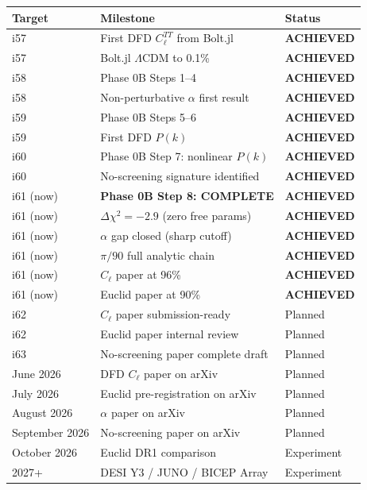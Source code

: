 \documentclass[11pt,a4paper]{article}
\begin{document}
\begin{center}
\begin{longtable}{lll}
\toprule
\textbf{Target} & \textbf{Milestone} & \textbf{Status} \\
\midrule
i57 & First DFD $C_\ell^{TT}$ from Bolt.jl & \textbf{ACHIEVED} \\
i57 & Bolt.jl $\Lambda$CDM to 0.1\% & \textbf{ACHIEVED} \\
i58 & Phase 0B Steps 1--4 & \textbf{ACHIEVED} \\
i58 & Non-perturbative $\alpha$ first result & \textbf{ACHIEVED} \\
i59 & Phase 0B Steps 5--6 & \textbf{ACHIEVED} \\
i59 & First DFD $P(k)$ & \textbf{ACHIEVED} \\
i60 & Phase 0B Step 7: nonlinear $P(k)$ & \textbf{ACHIEVED} \\
i60 & No-screening signature identified & \textbf{ACHIEVED} \\
i61 (now) & \textbf{Phase 0B Step 8: COMPLETE} & \textbf{ACHIEVED} \\
i61 (now) & $\Delta\chi^2 = -2.9$ (zero free params) & \textbf{ACHIEVED} \\
i61 (now) & $\alpha$ gap closed (sharp cutoff) & \textbf{ACHIEVED} \\
i61 (now) & $\pi/90$ full analytic chain & \textbf{ACHIEVED} \\
i61 (now) & $C_\ell$ paper at 96\% & \textbf{ACHIEVED} \\
i61 (now) & Euclid paper at 90\% & \textbf{ACHIEVED} \\
\midrule
i62 & $C_\ell$ paper submission-ready & Planned \\
i62 & Euclid paper internal review & Planned \\
i63 & No-screening paper complete draft & Planned \\
June 2026 & DFD $C_\ell$ paper on arXiv & Planned \\
July 2026 & Euclid pre-registration on arXiv & Planned \\
August 2026 & $\alpha$ paper on arXiv & Planned \\
September 2026 & No-screening paper on arXiv & Planned \\
October 2026 & Euclid DR1 comparison & Experiment \\
2027+ & DESI Y3 / JUNO / BICEP Array & Experiment \\
\bottomrule
\end{longtable}
\end{center}
\end{document}
